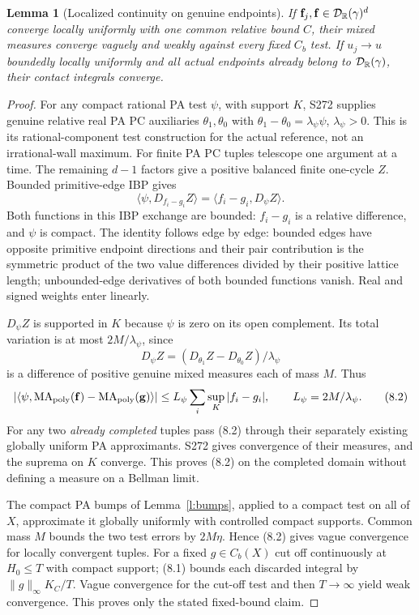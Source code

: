 \documentclass[11pt]{article}
\newtheorem{lemma}[theorem]{Lemma}
\newcommand{\MA}{\operatorname{MA}_{\rm poly}}\newcommand{\rec}{\operatorname{rec}}
\begin{document}
\begin{lemma}[Localized continuity on genuine endpoints]\label{l:local}
If $\mathbf f_j,\mathbf f\in\mathcal D_\mathbb R(\gamma)^d$ converge locally uniformly with one common relative bound $C$, their mixed measures converge vaguely and weakly against every fixed $C_b$ test. If $u_j\to u$ boundedly locally uniformly and \emph{all} actual endpoints already belong to $\mathcal D_\mathbb R(\gamma)$, their contact integrals converge.
\end{lemma}
\begin{proof}
For any compact rational PA test $\psi$, with support $K$, S272 supplies genuine relative real PA PC auxiliaries $\theta_1,\theta_0$ with $\theta_1-\theta_0=\lambda_\psi\psi$, $\lambda_\psi>0$. This is its rational-component test construction for the actual reference, not an irrational-wall maximum. For finite PA PC tuples telescope one argument at a time. The remaining $d-1$ factors give a positive balanced finite one-cycle $Z$. Bounded primitive-edge IBP gives
\[
 \langle\psi,D_{f_i-g_i}Z\rangle
                         =\langle f_i-g_i,D_\psi Z\rangle.
\]
Both functions in this IBP exchange are bounded: $f_i-g_i$ is a relative difference, and $\psi$ is compact. The identity follows edge by edge: bounded edges have opposite primitive endpoint directions and their pair contribution is the symmetric product of the two value differences divided by their positive lattice length; unbounded-edge derivatives of both bounded functions vanish. Real and signed weights enter linearly.

$D_\psi Z$ is supported in $K$ because $\psi$ is zero on its open complement. Its total variation is at most $2M/\lambda_\psi$, since
\[
           D_\psi Z=(D_{\theta_1}Z-D_{\theta_0}Z)/\lambda_\psi
\]
is a difference of positive genuine mixed measures each of mass $M$. Thus
\[
 |\langle\psi,\MA(\mathbf f)-\MA(\mathbf g)\rangle|
 \leq L_\psi\sum_i\sup_K|f_i-g_i|,
                  \qquad L_\psi=2M/\lambda_\psi.                    \tag{8.2}
\]
For any two \emph{already completed} tuples pass (8.2) through their separately existing globally uniform PA approximants. S272 gives convergence of their measures, and the suprema on $K$ converge. This proves (8.2) on the completed domain without defining a measure on a Bellman limit.

The compact PA bumps of Lemma~\ref{l:bumps}, applied to a compact test on all of $X$, approximate it globally uniformly with controlled compact supports. Common mass $M$ bounds the two test errors by $2M\eta$. Hence (8.2) gives vague convergence for locally convergent tuples. For a fixed $g\in C_b(X)$ cut off continuously at $H_0\leq T$ with compact support; (8.1) bounds each discarded integral by $\|g\|_\infty K_C/T$. Vague convergence for the cut-off test and then $T\to\infty$ yield weak convergence. This proves only the stated fixed-bound claim.


\end{proof}
\end{document}
